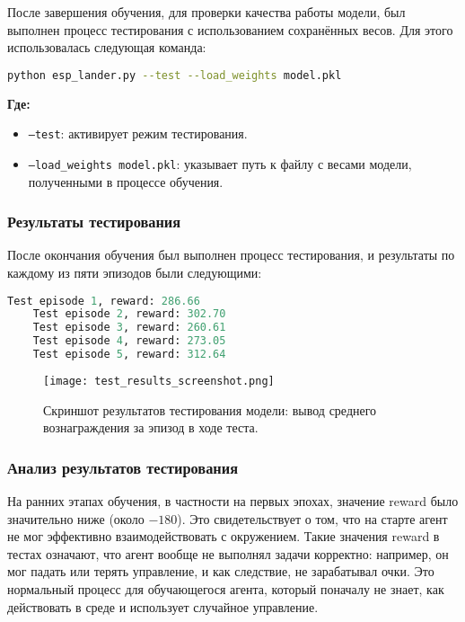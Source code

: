 \documentclass[a4paper,12pt]{article}
\begin{document}
После завершения обучения, для проверки качества работы модели, был выполнен процесс тестирования с использованием сохранённых весов. Для этого использовалась следующая команда:

\begin{lstlisting}[language=bash]
	python esp_lander.py --test --load_weights model.pkl
\end{lstlisting}

\textbf{Где:}
\begin{itemize}
	\item \texttt{--test}: активирует режим тестирования.
	\item \texttt{--load\_weights model.pkl}: указывает путь к файлу с весами модели, полученными в процессе обучения.
\end{itemize}

\subsubsection{Результаты тестирования}

После окончания обучения был выполнен процесс тестирования, и результаты по каждому из пяти эпизодов были следующими:

\begin{lstlisting}[language=Python]
	Test episode 1, reward: 286.66
	Test episode 2, reward: 302.70
	Test episode 3, reward: 260.61
	Test episode 4, reward: 273.05
	Test episode 5, reward: 312.64
\end{lstlisting}

\begin{figure}[H]
	\centering
	\texttt{[image: test\_results\_screenshot.png]}
	\caption{Скриншот результатов тестирования модели: вывод среднего вознаграждения за эпизод в ходе теста.}
	\label{fig:test_results}
\end{figure}

\subsubsection{Анализ результатов тестирования}

На ранних этапах обучения, в частности на первых эпохах, значение reward было значительно ниже (около $-180$). Это свидетельствует о том, что на старте агент не мог эффективно взаимодействовать с окружением. Такие значения reward в тестах означают, что агент вообще не выполнял задачи корректно: например, он мог падать или терять управление, и как следствие, не зарабатывал очки. Это нормальный процесс для обучающегося агента, который поначалу не знает, как действовать в среде и использует случайное управление.
\end{document}
